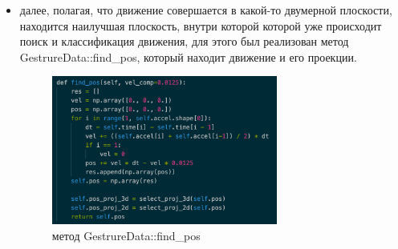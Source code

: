 \begin{itemize}
  \item далее, полагая, что движение совершается в какой-то двумерной плоскости, находится наилучшая плоскость, внутри которой которой уже происходит поиск и классификация движения, для этого был реализован метод GestrureData::find\_pos, который находит движение и его проекции.
  \begin{figure}[H]
    \begin{center}
        \includegraphics[width=0.7\textwidth]{images/find_pos.png}
    \end{center}
    \caption{метод GestrureData::find\_pos}
  \end{figure}
\end{itemize}

